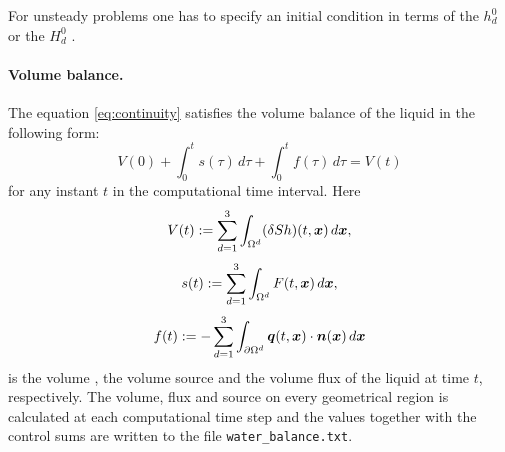 %
%





For unsteady problems one has to specify an initial condition in terms of the 
$h_d^0$ 
or the 
$H_d^0$ .

\paragraph{Volume balance.}
The equation \eqref{eq:continuity} satisfies the volume balance of the liquid in the following form:
\[ V(0) + \int_0^t s(\tau) \,d\tau + \int_0^t f(\tau) \,d\tau = V(t) \]
for any instant $t$ in the computational time interval.
Here
$$ V(t) := \sum_{d=1}^3\int_{\Omega^d}(\delta S h)(t,\mathbf{\boldsymbol{x}})\,d\mathbf{\boldsymbol{x}}, $$
$$ s(t) := \sum_{d=1}^3\int_{\Omega^d}F(t,\mathbf{\boldsymbol{x}})\,d\mathbf{\boldsymbol{x}}, $$
$$ f(t) := -\sum_{d=1}^3\int_{\partial\Omega^d}\mathbf{\boldsymbol{q}}(t,\mathbf{\boldsymbol{x}})\cdot\mathbf{\boldsymbol{n}}(\mathbf{\boldsymbol{x}}) \,d\mathbf{\boldsymbol{x}} $$
is the volume , the volume source  and the volume flux  of the liquid at time $t$, respectively.
The volume, flux and source on every geometrical region is calculated at each computational time step and the values together with the control sums are written to the file \texttt{water\_balance.txt}.




